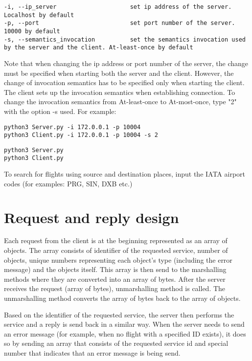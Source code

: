 \documentclass[12pt,a4paper]{article}
\begin{document}
\begin{lstlisting}[caption={Options},xleftmargin=.03\textwidth]
-i, --ip_server                     set ip address of the server. Localhost by default
-p, --port                          set port number of the server. 10000 by default
-s, --semantics_invocation          set the semantics invocation used by the server and the client. At-least-once by default
\end{lstlisting}
\medskip

Note that when changing the ip address or port number of the server, the change must be specified when starting both the server and the client. However, the change of invocation semantics has to be specified only when starting the client. The client sets up the invocation semantics when establishing connection. To change the invocation semantics from At-least-once to At-most-once, type "2" with the option -s used. For example:

\begin{lstlisting}[caption={Example how to run the program},xleftmargin=.03\textwidth]
python3 Server.py -i 172.0.0.1 -p 10004
python3 Client.py -i 172.0.0.1 -p 10004 -s 2
\end{lstlisting}
\medskip

\begin{lstlisting}[caption={Example how to run the program, with all options set to default},xleftmargin=.03\textwidth]
python3 Server.py
python3 Client.py
\end{lstlisting}
\medskip

To search for flights using source and destination places, input the IATA airport codes (for examples: PRG, SIN, DXB etc.)

\section{Request and reply design}
Each request from the client is at the beginning represented as an array of objects. The array consists of identifier of the requested service, number of objects, unique numbers representing each object's type (including the error message) and the objects itself. This array is then send to the marshalling methods where they are converted into an array of bytes. After the server receives the request (array of bytes), unmarshalling method is called. The unmarshalling method converts the array of bytes back to the array of objects.\par \medskip Based on the identifier of the requested service, the server then performs the service and a reply is send back in a similar way. When the server needs to send an error message (for example, when no flight with a specified ID exists), it does so by sending an array that consists of the requested service id and special number that indicates that an error message is being send.  
\end{document}
